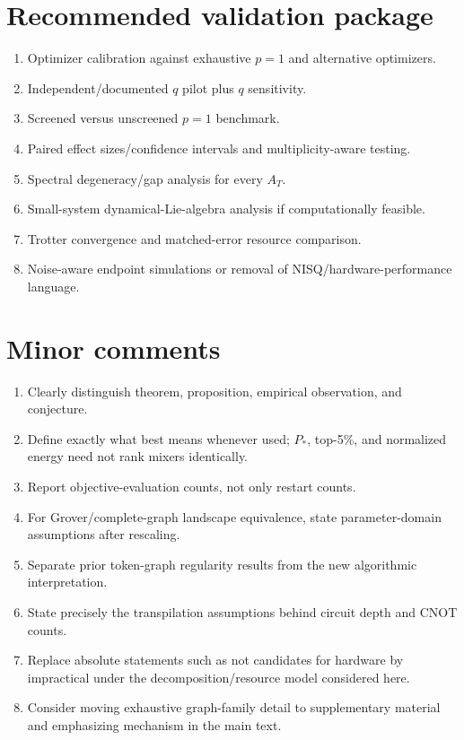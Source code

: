 \documentclass[11pt]{article}
\begin{document}
\section*{Recommended validation package}
\begin{enumerate}
\item Optimizer calibration against exhaustive $p=1$ and alternative optimizers.
\item Independent/documented $q$ pilot plus $q$ sensitivity.
\item Screened versus unscreened $p=1$ benchmark.
\item Paired effect sizes/confidence intervals and multiplicity-aware testing.
\item Spectral degeneracy/gap analysis for every $A_T$.
\item Small-system dynamical-Lie-algebra analysis if computationally feasible.
\item Trotter convergence and matched-error resource comparison.
\item Noise-aware endpoint simulations or removal of NISQ/hardware-performance language.
\end{enumerate}

\section*{Minor comments}
\begin{enumerate}
\item Clearly distinguish theorem, proposition, empirical observation, and conjecture.
\item Define exactly what best means whenever used; $P_*$, top-5\%, and normalized energy need not rank mixers identically.
\item Report objective-evaluation counts, not only restart counts.
\item For Grover/complete-graph landscape equivalence, state parameter-domain assumptions after rescaling.
\item Separate prior token-graph regularity results from the new algorithmic interpretation.
\item State precisely the transpilation assumptions behind circuit depth and CNOT counts.
\item Replace absolute statements such as not candidates for hardware by impractical under the decomposition/resource model considered here.
\item Consider moving exhaustive graph-family detail to supplementary material and emphasizing mechanism in the main text.
\end{enumerate}
\end{document}
